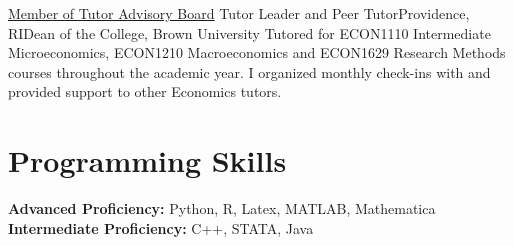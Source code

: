 \documentclass[10pt,a4paper,roman]{moderncv}        %
\begin{document}
{\color{blue}\href{https://www.brown.edu/sheridan/programs-services/tutoring/staff}{Member
    of Tutor Advisory Board}\color{black}}
{Tutor Leader and Peer Tutor}{Providence, RI}{Dean of the College, Brown
  University}
{Tutored for ECON1110 Intermediate Microeconomics,
  ECON1210 Macroeconomics
  and ECON1629 Research Methods courses throughout the academic year.
  I organized monthly check-ins with and provided support to other Economics tutors.}


\section{Programming Skills}
\textbf{Advanced Proficiency: } Python, R, Latex, MATLAB, Mathematica\\
\textbf{Intermediate Proficiency: } C++, STATA, Java
\end{document}
